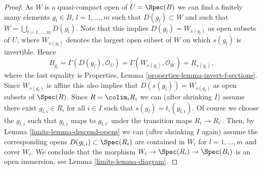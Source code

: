 \begin{proof}
\medskip\noindent
As $W$ is a quasi-compact open of $U = \Spec(B)$
we can find a finitely many elements $g_l \in B$, $l = 1, \ldots, m$
such that $D(g_l) \subset W$ and such that
$W = \bigcup_{l = 1, \ldots, m} D(g_l)$.
Note that this implies $D(g_l) = W_{s(g_l)}$ as open subsets of $U$,
where $W_{s(g_l)}$ denotes the largest open subset of $W$ on which
$s(g_l)$ is invertible. Hence
$$
B_{g_l} =
\Gamma(D(g_l), \mathcal{O}_U) =
\Gamma(W_{s(g_l)}, \mathcal{O}_W) = R_{s(g_l)},
$$
where the last equality is
Properties, Lemma \ref{properties-lemma-invert-f-sections}.
Since $W_{s(g_l)}$ is affine this also
implies that $D(s(g_l)) = W_{s(g_l)}$ as open subsets of $\Spec(R)$.
Since $R = \colim_i R_i$ we can (after shrinking $I$)
assume there exist $g_{l, i} \in R_i$ for all $i \in I$ such that
$s(g_l) = t_i(g_{l, i})$. Of course we choose the $g_{l, i}$
such that $g_{l, i}$ maps to $g_{l, i'}$ under the transition maps
$R_i \to R_{i'}$. Then, by Lemma \ref{limits-lemma-descend-opens} we can
(after shrinking $I$ again)
assume the corresponding opens $D(g_{l, i}) \subset \Spec(R_i)$
are contained in $W_i$ for $l = 1, \ldots, m$ and cover $W_i$.
We conclude that the morphism $W_i \to \Spec(R_i) \to \Spec(B_i)$
is an open immersion, see Lemma \ref{limits-lemma-diagram}.


\end{proof}
